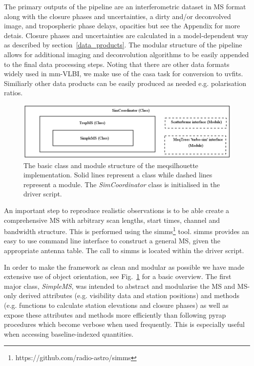      


The primary outputs of the pipeline are an interferometric dataset in MS format along with the closure phases and uncertainties, a dirty and/or deconvolved image, and tropospheric phase delays, opacities but see the Appendix for more detais. Closure phases and uncertainties are calculated in a model-dependent way as described by section~\ref{data_products}. The modular structure of the pipeline allows for additional imaging and deconvolution algorithms to be easily appended to the final data processing steps. Noting that there are other data formats widely used in mm-VLBI, we make use of the {\sc casa} task for conversion to {\sc uvfits}. Similiarly other data products can be easily produced as needed e.g. polarisation ratios.




\begin{figure}
\includegraphics[width=\columnwidth]{Images/Class_module_structure}
\caption[The basic class and module structure of the {\sc meqsilhouette} implementation.]{The basic class and module structure of the {\sc meqsilhouette} implementation. Solid lines represent a class while dashed lines represent a module. The \emph{SimCoordinator} class is initialised in the driver script. \label{class_struc}%
}
\end{figure}

An important step to reproduce realistic observations is to be able create a comprehensive MS with arbitrary scan lengths, start times, channel and bandwidth structure. This is performed using the {\sc simms}\footnote{https://github.com/radio-astro/simms} tool. {\sc simms} provides an easy to use command line interface to construct a general MS, given the appropriate antenna table. The call to {\sc simms} is located within the driver script. 

In order to make the framework as clean and  modular as possible we have made extensive use of object orientation, see Fig.~\ref{class_struc} for a basic overview. The first major class, \emph{SimpleMS}, was intended to abstract and modularise the MS and MS-only derived attributes (e.g. visibility data and station positions) and methods (e.g. functions to calculate station elevations and closure phases) as well as expose these attributes and methods more efficiently than following {\sc pyrap} procedures which become verbose when used frequently. This is especially useful when accessing baseline-indexed quantities. 

